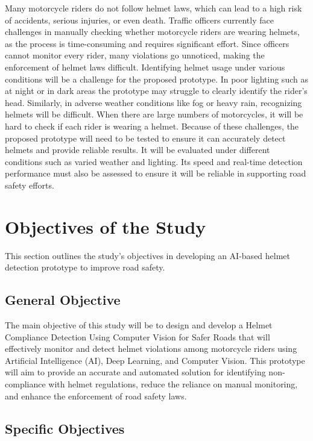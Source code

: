 \begin{refsection}
Many motorcycle riders do not follow helmet laws, which can lead to a high risk of accidents, serious injuries, or even death. Traffic officers currently face challenges in manually checking whether motorcycle riders are wearing helmets, as the process is time-consuming and requires significant effort. Since officers cannot monitor every rider, many violations go unnoticed, making the enforcement of helmet laws difficult. Identifying helmet usage under various conditions will be a challenge for the proposed prototype. In poor lighting such as at night or in dark areas the prototype may struggle to clearly identify the rider’s head. Similarly, in adverse weather conditions like fog or heavy rain, recognizing helmets will be difficult. When there are large numbers of motorcycles, it will be hard to check if each rider is wearing a helmet. Because of these challenges, the proposed prototype will need to be tested to ensure it can accurately detect helmets and provide reliable results. It will be evaluated under different conditions such as varied weather and lighting. Its speed and real-time detection performance must also be assessed to ensure it will be reliable in supporting road safety efforts.

\section{Objectives of the Study}
This section outlines the study’s objectives in developing an AI-based helmet detection prototype to improve road safety.

\subsection{General Objective}

The main objective of this study will be to design and develop a Helmet Compliance Detection Using Computer Vision for Safer Roads that will effectively monitor and detect helmet violations among motorcycle riders using Artificial Intelligence (AI), Deep Learning, and Computer Vision. This prototype will aim to provide an accurate and automated solution for identifying non-compliance with helmet regulations, reduce the reliance on manual monitoring, and enhance the enforcement of road safety laws.

\subsection{Specific Objectives}


\end{refsection}
